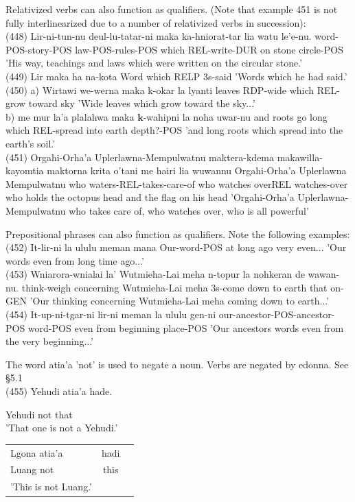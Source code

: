 \documentclass[10pt]{article}
\begin{document}
Relativized verbs can also function as qualifiers. (Note that example 451 is not fully interlinearized due to a number of relativized verbs in succession):\\
(448) Lir-ni-tun-nu deul-lu-tatar-ni maka ka-hniorat-tar lia watu le'e-nu. word-POS-story-POS law-POS-rules-POS which REL-write-DUR on stone circle-POS 'His way, teachings and laws which were written on the circular stone.'\\
(449) Lir maka ha na-kota Word which RELP 3s-said 'Words which he had said.'\\
(450) a) Wirtawi we-werna maka k-okar la lyanti leaves RDP-wide which REL-grow toward sky 'Wide leaves which grow toward the sky...'\\
b) me mur la'a plalahwa maka \(\boldsymbol{k}\)-wahipni la noha uwar-nu and roots go long which REL-spread into earth depth?-POS 'and long roots which spread into the earth's soil.'\\
(451) Orgahi-Orha'a Uplerlawna-Mempulwatnu maktera-kdema makawilla-kayomtia maktorna krita o'tani me hairi lia wuwannu Orgahi-Orha'a Uplerlawna Mempulwatnu who waters-REL-takes-care-of who watches overREL watches-over who holds the octopus head and the flag on his head 'Orgahi-Orha'a Uplerlawna-Mempulwatnu who takes care of, who watches over, who is all powerful'

Prepositional phrases can also function as qualifiers. Note the following examples:\\
(452) It-lir-ni la ululu meman mana Our-word-POS at long ago very even... 'Our words even from long time ago...'\\
(453) Wniarora-wnialai la' Wutmieha-Lai meha n-topur la nohkeran de wawan-nu. think-weigh concerning Wutmieha-Lai meha 3s-come down to earth that on-GEN 'Our thinking concerning Wutmieha-Lai meha coming down to earth...'\\
(454) It-up-ni-tgar-ni lir-ni meman la ululu gen-ni our-ancestor-POS-ancestor-POS word-POS even from beginning place-POS 'Our ancestors words even from the very beginning...'

The word atia'a 'not' is used to negate a noun. Verbs are negated by edonna. See §5.1\\
(455) Yehudi atia'a hade.

Yehudi not that\\
'That one is not a Yehudi.'

\begin{center}
\begin{tabular}{lcc}
Lgona atia'a & hadi \\
Luang not & this \\
'This is not Luang.' &  \\
\end{tabular}
\end{center}
\end{document}

